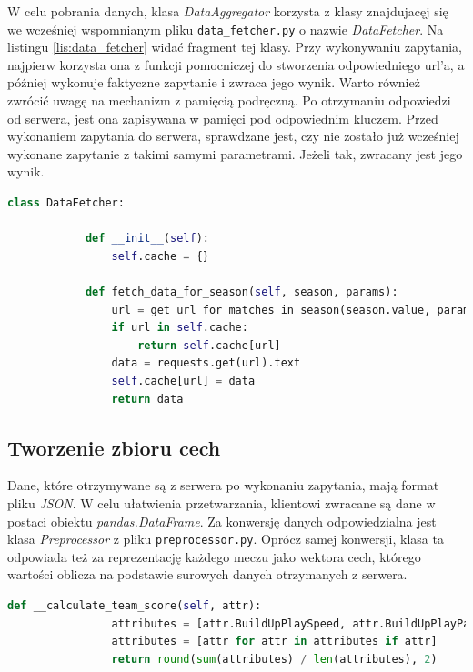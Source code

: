         W celu pobrania danych, klasa \emph{DataAggregator} korzysta z klasy znajdujacęj się we wcześniej wspomnianym pliku \texttt{data\_fetcher.py} o nazwie \emph{DataFetcher}. Na listingu \ref{lis:data_fetcher} widać fragment tej klasy. Przy wykonywaniu zapytania, najpierw korzysta ona z funkcji pomocniczej do stworzenia odpowiedniego url'a, a później wykonuje faktyczne zapytanie i zwraca jego wynik. Warto również zwrócić uwagę na mechanizm z pamięcią podręczną. Po otrzymaniu odpowiedzi od serwera, jest ona zapisywana w pamięci pod odpowiednim kluczem. Przed wykonaniem zapytania do serwera, sprawdzane jest, czy nie zostało już wcześniej wykonane zapytanie z takimi samymi parametrami. Jeżeli tak, zwracany jest jego wynik.
        
        
        \begin{lstlisting}[language=Python, label={lis:data_fetcher}, caption=Fragment klasy \emph{DataFetcher}]
        class DataFetcher:

            def __init__(self):
                self.cache = {}

            def fetch_data_for_season(self, season, params):
                url = get_url_for_matches_in_season(season.value, params)
                if url in self.cache:
                    return self.cache[url]
                data = requests.get(url).text
                self.cache[url] = data
                return data
        \end{lstlisting}
    
        
        
        \subsection{Tworzenie zbioru cech}
        Dane, które otrzymywane są z serwera po wykonaniu zapytania, mają format pliku \emph{JSON}. W celu ułatwienia przetwarzania, klientowi zwracane są dane w postaci obiektu \emph{pandas.DataFrame}. Za konwersję danych odpowiedzialna jest klasa \emph{Preprocessor} z pliku \texttt{preprocessor.py}. Oprócz samej konwersji, klasa ta odpowiada też za reprezentację każdego meczu jako wektora cech, którego wartości oblicza na podstawie surowych danych otrzymanych z serwera.
        
        \begin{lstlisting}[language=Python, label={lis:preprocessor}, caption=Obliczanie  wartości cechy \emph{home\_team\_score}]
            def __calculate_team_score(self, attr):
                attributes = [attr.BuildUpPlaySpeed, attr.BuildUpPlayPassing, attr.ChanceCreationPassing, attr.ChanceCreationCrossing, attr.ChanceCreationShooting, attr.DefencePressure, attr.DefenceAggression, attr.DefenceTeamWidth]
                attributes = [attr for attr in attributes if attr]
                return round(sum(attributes) / len(attributes), 2)
        \end{lstlisting}
        
